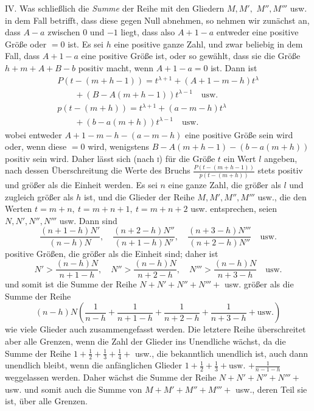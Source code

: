 IV. Was schließlich die \textit{Summe} der Reihe mit den Gliedern $M,M',$ $M'',M'''$ usw. in dem Fall betrifft, dass diese gegen Null abnehmen, so nehmen wir zunächst an, dass $A-a$ zwischen $0$ und $-1$ liegt, dass also $A+1-a$ entweder eine positive Größe oder $=0$ ist. Es sei $h$ eine positive ganze Zahl, und zwar beliebig in dem Fall, dass $A+1-a$ eine positive Größe ist, oder so gewählt, dass sie die Größe $h+m+A+B-b$ positiv macht, wenn $A+1-a=0$ ist. Dann ist
\[
\begin{array}{l}
P(t-(m+h-1))=t^{\lambda+1}+(A+1-m-h)t^\lambda\\\qquad{}+(B-A(m+h-1))t^{\lambda-1}\quad\mathrm{usw.}\\
p(t-(m+h))=t^{\lambda+1}+(a-m-h)t^\lambda\\\qquad{}+(b-a(m+h))t^{\lambda-1}\quad\mathrm{usw.}
\end{array}
\]
wobei entweder $A+1-m-h-(a-m-h)$ eine positive Größe sein wird oder, wenn diese $=0$ wird, wenigstens $B-A(m+h-1)-(b-a(m+h))$ positiv sein wird. Daher lässt sich (nach \textsc{i}) für die Größe $t$ ein Wert $l$ angeben, nach dessen Überschreitung die Werte des Bruchs $\frac{P(t-(m+h-1))}{p(t-(m+h))}$ stets positiv und größer als die Einheit werden. Es sei $n$ eine ganze Zahl,
die größer als $l$ und zugleich größer als $h$ ist, und die Glieder der Reihe $M,M',M'',M'''$ usw., die den Werten $t=m+n,\ t=m+n+1,\ t=m+n+2$ usw. entsprechen, seien $N,N',N'',N'''$ usw. Dann sind
\[
\frac{(n+1-h)N'}{(n-h)N},\quad
\frac{(n+2-h)N''}{(n+1-h)N'},\quad
\frac{(n+3-h)N'''}{(n+2-h)N''}\quad\mathrm{usw.}
\]
positive Größen, die größer als die Einheit sind; daher ist
\[
N'>\frac{(n-h)N}{n+1-h},\quad
N''>\frac{(n-h)N}{n+2-h},\quad
N'''>\frac{(n-h)N}{n+3-h}\quad\mathrm{usw.}
\]
und somit ist die Summe der Reihe $N+N'+N''+N'''+$ usw. größer als die Summe der Reihe
\[
(n-h)N\left(\frac{1}{n-h}+\frac{1}{n+1-h}+\frac{1}{n+2-h}+\frac{1}{n+3-h}+\mathrm{usw.}\right)
\]
wie viele Glieder auch zusammengefasst werden. Die letztere Reihe überschreitet aber alle Grenzen, wenn die Zahl der Glieder ins Unendliche wächst, da die Summe der Reihe $1+\frac12+\frac13+\frac14+$ usw., die bekanntlich unendlich ist, auch dann unendlich bleibt, wenn die anfänglichen Glieder $1+\frac12+\frac13+\mathrm{usw.}$ $+\frac{1}{n-1-h}$ weggelassen werden. Daher wächst die Summe der Reihe $N+N'+N''+N'''+$ usw. und somit auch die Summe von $M+M'+M''+M'''+$ usw., deren Teil sie ist, über alle Grenzen.


